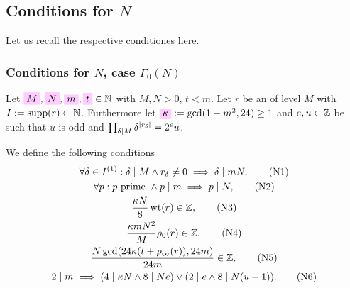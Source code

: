 \documentclass{article}
\begin{document}
\subsection{Conditions for $N$}
Let us recall the respective conditiones here.
\subsubsection{Conditions for $N$, case $\Gamma_0(N)$}

\begin{Definition}\cite[Def.~35]{Radu_RamanujanKolberg_2015}
  \label{def:condition-co-eta-quotient-gamma0}
  Let
  $\defineNotation[M]{M}, \defineNotation[N]{N},
  \defineNotation[m]{m}, \defineNotation{t} \in \setN$ with $M,N>0$,
  $t<m$.
  Let $r$ be an  of level $M$
  with $I := \operatorname{supp}(r) \subset \mathbb{N}$.
  Furthermore let $\defineNotation[kappa]{\kappa} :=\gcd(1-m^2,
  24)\ge1$
  and $e, u\in\mathbb{Z}$ be such that $u$ is odd and
  $\prod_{\delta \mid M} \delta^{\lvert r_\delta\rvert}=2^e u$.


  We define the following conditions
  \begin{gather}
    \forall \delta \in I^{(1)}:
    \delta \mid M \land r_\delta\ne0 \implies \delta \mid mN,
    \tag{N1}
    \label{eq:delta|M=>delta|mN}
    \\
    \forall p:
    p\text{ prime } \land p \mid m \implies p \mid N,
    \tag{N2}
    \label{eq:p|m=>p|N}
    \\
    \frac{\kappa N}{8} \operatorname{wt}(r) \in \mathbb{Z},
    \tag{N3}
    \label{eq:sum-r}
    \\
    \frac{\kappa m N^2}{M} \rho_0(r) \in \mathbb{Z},
    \tag{N4}
    \label{eq:rv24}
    \\
    \frac{N \gcd(24 \kappa(t + \rho_\infty(r)),24m)}{24m} \in \mathbb{Z},
    \tag{N5}
    \label{eq:w|N}
    \\
    2 \mid m \implies (4 \mid \kappa N \land 8 \mid N e)
    \lor
    (2 \mid e \land 8 \mid N(u-1)).
    \tag{N6}
    \label{eq:even-m}
  \end{gather}
\end{Definition}
\end{document}
